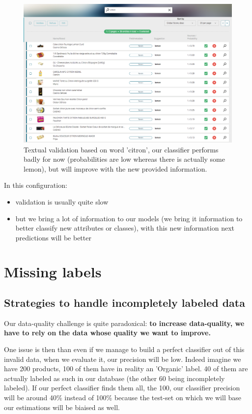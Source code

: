 \begin{figure}[H]
\centering
\includegraphics[scale=0.30]{./images/calibration/textual-validation.png}
\caption{Textual validation based on word 'citron', our classifier performs badly for now (probabilities are low whereas there is actually some lemon), but will improve with the new provided information.}
\label{fig:textualvalidation}
\end{figure}


In this configuration:
\begin{itemize}
	\item validation is usually quite slow
	\item but we bring a lot of information to our models (we bring it information to better classify new attributes or classes), with this new information next predictions will be better
\end{itemize}


\section{Missing labels}

\subsection{Strategies to handle incompletely labeled data}

Our data-quality challenge is quite paradoxical: \textbf{to increase data-quality, we have to rely on the data whose quality we want to improve.}

One issue is then than even if we manage to build a perfect classifier out of this invalid data, when we evaluate it, our precision will be low. Indeed imagine we have 200 products, 100 of them have in reality an 'Organic' label. 40 of them are actually labeled as such in our database (the other 60 being incompletely labeled). If our perfect classifier finds them all, the 100, our classifier precision will be around 40\% instead of 100\% because the test-set on which we will base our estimations will be biaised as well.

